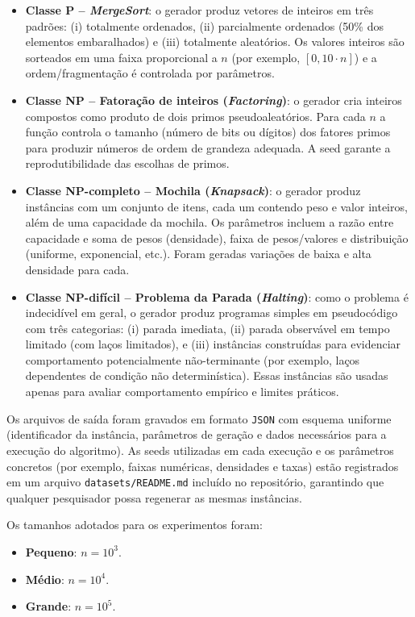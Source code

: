 \documentclass[12pt,a4paper]{article}
\newcommand{\eng}[1]{\textit{#1}}
\begin{document}
\begin{itemize}
  \item \textbf{Classe P -- \eng{MergeSort}}: o gerador produz vetores de inteiros em três padrões:
    (i) totalmente ordenados, (ii) parcialmente ordenados (50\% dos elementos embaralhados) e (iii) totalmente aleatórios. Os valores inteiros são sorteados em uma faixa proporcional a \(n\) (por exemplo, \([0, 10 \cdot n]\)) e a ordem/fragmentação é controlada por parâmetros.

  \item \textbf{Classe NP -- Fatoração de inteiros (\eng{Factoring})}: o gerador cria inteiros compostos como produto de dois primos pseudoaleatórios. Para cada \(n\) a função controla o tamanho (número de bits ou dígitos) dos fatores primos para produzir números de ordem de grandeza adequada. A seed garante a reprodutibilidade das escolhas de primos.

  \item \textbf{Classe NP-completo -- Mochila (\eng{Knapsack})}: o gerador produz instâncias com um conjunto de itens, cada um contendo peso e valor inteiros, além de uma capacidade da mochila. Os parâmetros incluem a razão entre capacidade e soma de pesos (densidade), faixa de pesos/valores e distribuição (uniforme, exponencial, etc.). Foram geradas variações de baixa e alta densidade para cada.

  \item \textbf{Classe NP-difícil -- Problema da Parada (\eng{Halting})}: como o problema é indecidível em geral, o gerador produz programas simples em pseudocódigo com três categorias: (i) parada imediata, (ii) parada observável em tempo limitado (com laços limitados), e (iii) instâncias construídas para evidenciar comportamento potencialmente não-terminante (por exemplo, laços dependentes de condição não determinística). Essas instâncias são usadas apenas para avaliar comportamento empírico e limites práticos.
\end{itemize}

Os arquivos de saída foram gravados em formato \texttt{JSON} com esquema uniforme (identificador da instância, parâmetros de geração e dados necessários para a execução do algoritmo). As seeds utilizadas em cada execução e os parâmetros concretos (por exemplo, faixas numéricas, densidades e taxas) estão registrados em um arquivo \texttt{datasets/README.md} incluído no repositório, garantindo que qualquer pesquisador possa regenerar as mesmas instâncias.

Os tamanhos adotados para os experimentos foram:
\begin{itemize}
  \item \textbf{Pequeno}: \(n = 10^3\).
  \item \textbf{Médio}: \(n = 10^4\).
  \item \textbf{Grande}: \(n = 10^5\).
\end{itemize}
\end{document}
